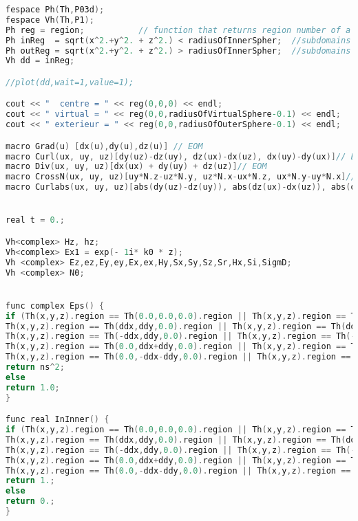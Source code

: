 \begin{lstlisting}[language=C]
fespace Ph(Th,P03d);
fespace Vh(Th,P1);
Ph reg = region;           // function that returns region number of a point XY
Ph inReg  = sqrt(x^2.+y^2. + z^2.) < radiusOfInnerSpher;  //subdomains for inside the sratterer
Ph outReg = sqrt(x^2.+y^2. + z^2.) > radiusOfInnerSpher;  //subdomains for outside the scatterer
Vh dd = inReg;

//plot(dd,wait=1,value=1);

cout << "  centre = " << reg(0,0,0) << endl;
cout << " virtual = " << reg(0,0,radiusOfVirtualSphere-0.1) << endl;
cout << " exterieur = " << reg(0,0,radiusOfOuterSphere-0.1) << endl;

macro Grad(u) [dx(u),dy(u),dz(u)] // EOM
macro Curl(ux, uy, uz)[dy(uz)-dz(uy), dz(ux)-dx(uz), dx(uy)-dy(ux)]// EOM
macro Div(ux, uy, uz)[dx(ux) + dy(uy) + dz(uz)]// EOM
macro CrossN(ux, uy, uz)[uy*N.z-uz*N.y, uz*N.x-ux*N.z, ux*N.y-uy*N.x]// EOM
macro Curlabs(ux, uy, uz)[abs(dy(uz)-dz(uy)), abs(dz(ux)-dx(uz)), abs(dx(uy)-dy(ux))]// EOM


real t = 0.;

Vh<complex> Hz, hz;
Vh<complex> Ex1 = exp(- 1i* k0 * z);
Vh <complex> Ez,ez,Ey,ey,Ex,ex,Hy,Sx,Sy,Sz,Sr,Hx,Si,SigmD;
Vh <complex> N0;


func complex Eps() {
if (Th(x,y,z).region == Th(0.0,0.0,0.0).region || Th(x,y,z).region == Th(ddx,0.0,0.0).region || Th(x,y,z).region == Th(-ddx,0.0,0.0).region || Th(x,y,z).region == Th(0.0, ddx, 0.0).region || Th(x,y,z).region == Th(0.0,-ddx,0.0).region ||
Th(x,y,z).region == Th(ddx,ddy,0.0).region || Th(x,y,z).region == Th(ddx+ddy,0.0,0.0).region || Th(x,y,z).region == Th(ddx,-ddy,0.0).region ||
Th(x,y,z).region == Th(-ddx,ddy,0.0).region || Th(x,y,z).region == Th(-ddx-ddy,0.0,0.0).region || Th(x,y,z).region == Th(-ddx,-ddy,0.0).region ||
Th(x,y,z).region == Th(0.0,ddx+ddy,0.0).region || Th(x,y,z).region == Th(ddy,ddx,0.0).region || Th(x,y,z).region == Th(-ddy,ddx,0.0).region ||
Th(x,y,z).region == Th(0.0,-ddx-ddy,0.0).region || Th(x,y,z).region == Th(ddy,-ddx,0.0).region || Th(x,y,z).region == Th(-ddy,-ddx,0.0).region)
return ns^2;
else 
return 1.0;
}

func real InInner() {
if (Th(x,y,z).region == Th(0.0,0.0,0.0).region || Th(x,y,z).region == Th(ddx,0.0,0.0).region || Th(x,y,z).region == Th(-ddx,0.0,0.0).region || Th(x,y,z).region == Th(0.0, ddx, 0.0).region || Th(x,y,z).region == Th(0.0,-ddx,0.0).region ||
Th(x,y,z).region == Th(ddx,ddy,0.0).region || Th(x,y,z).region == Th(ddx+ddy,0.0,0.0).region || Th(x,y,z).region == Th(ddx,-ddy,0.0).region ||
Th(x,y,z).region == Th(-ddx,ddy,0.0).region || Th(x,y,z).region == Th(-ddx-ddy,0.0,0.0).region || Th(x,y,z).region == Th(-ddx,-ddy,0.0).region ||
Th(x,y,z).region == Th(0.0,ddx+ddy,0.0).region || Th(x,y,z).region == Th(ddy,ddx,0.0).region || Th(x,y,z).region == Th(-ddy,ddx,0.0).region ||
Th(x,y,z).region == Th(0.0,-ddx-ddy,0.0).region || Th(x,y,z).region == Th(ddy,-ddx,0.0).region || Th(x,y,z).region == Th(-ddy,-ddx,0.0).region)
return 1.;
else 
return 0.;
}



\end{lstlisting}
